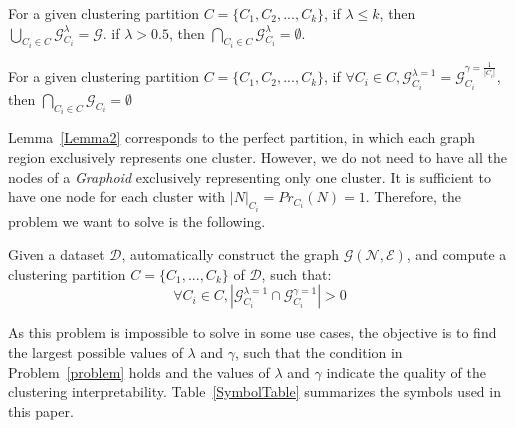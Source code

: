 \begin{lemma}
    For a given clustering partition $C = \{C_1,C_2,...,C_k\}$, if $\lambda \leq k$, then $\bigcup_{C_i \in C} \mathcal{G}^{\lambda}_{C_i} = \mathcal{G}$.
    if $\lambda > 0.5$, then $\bigcap_{C_i \in C} \mathcal{G}^{\lambda}_{C_i} = \emptyset$.
    \label{Lemma1} 
\end{lemma} 

\begin{lemma}
    For a given clustering partition $C = \{C_1,C_2,...,C_k\}$, if $\forall C_i \in C, \mathcal{G}^{\lambda=1}_{C_i} = \mathcal{G}^{\gamma=\frac{1}{|C_i|}}_{C_i}$, then $\bigcap_{C_i \in C} \mathcal{G}_{C_i} = \emptyset$
    \label{Lemma2} 
\end{lemma} 

Lemma~\ref{Lemma2} corresponds to the perfect partition, in which each graph region exclusively represents one cluster. 
However, we do not need to have all the nodes of a {\it Graphoid} exclusively representing only one cluster. 
It is sufficient to have one node for each cluster with $|N|_{C_i} = Pr_{C_i}(N) = 1$.  
Therefore, the problem we want to solve is the following.

\begin{problem}
	Given a dataset $\mathcal{D}$, automatically construct the graph $\mathcal{G}(\mathcal{N},\mathcal{E})$, and compute a clustering partition $C = \{C_1,...,C_k\}$ of $\mathcal{D}$, such that:  
{\small
 \[
 \forall C_i \in C, |\mathcal{G}^{\lambda=1}_{C_i}  \cap \mathcal{G}^{\gamma=1}_{C_i} |> 0
 \]
 }
 \label{problem}
\end{problem}

As this problem is impossible to solve in some use cases, the objective is to find the largest possible values of $\lambda$ and $\gamma$, such that the condition in Problem~\ref{problem} holds and the values of $\lambda$ and $\gamma$ indicate the quality of the clustering interpretability. Table~\ref{SymbolTable} summarizes the symbols used in this paper.

